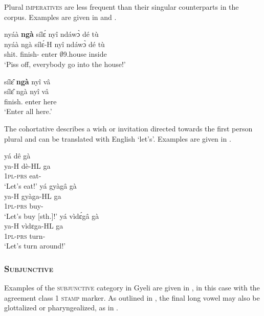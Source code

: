 Plural \textsc{imperatives} are less frequent than their singular counterparts in the corpus. Examples are given in  and .

\ea\label{IMPa}
  \glll nyáà {\bfseries ngà} sílɛ́ nyî ndáwɔ̀ dé tù \\
       nyáà ngà sílɛ́-H nyî ndáwɔ̀ dé tù \\
       shit.{\IMP} {\PL} finish-{\R} enter $\emptyset$9.house {\LOC} inside\\
    \trans `Piss off, everybody go into the house!'
\z

\ea\label{IMPb}
  \glll sílɛ̂ {\bfseries ngà} nyî vâ \\
       sílɛ̂ ngà nyî vâ \\
        finish.{\IMP} {\PL} enter here\\
    \trans `Enter all here.'
\z




The cohortative describes a wish or invitation directed towards the first person plural and can be translated with English `let's'. Examples are given in .

\ea\label{IMP1PL}
\ea
  \glll yá dê gà \\
         ya-H dè-HL ga\\
         1\textsc{pl}-\textsc{prs} eat-{\IMP} {\PL}\\
    \trans `Let's eat!' 
\ex 
  \glll yá gyàgâ gà \\
         ya-H gyàga-HL ga\\
         1\textsc{pl}-\textsc{prs} buy-{\IMP} {\PL}\\
    \trans `Let's buy [sth.]!' 
\ex 
  \glll yá vìdɛ́gâ gà \\
         ya-H vìdɛga-HL ga\\
         1\textsc{pl}-\textsc{prs} turn-{\IMP} {\PL}\\
    \trans `Let's turn around!'
\z
\z











\subsubsection{\textsc{Subjunctive}}
\label{sec:opt}

Examples of the \textsc{subjunctive} category in Gyeli are given in , in this case with the agreement class 1 \textsc{stamp} marker. As outlined in , the final long vowel may also be glottalized or pharyngealized, as in .


